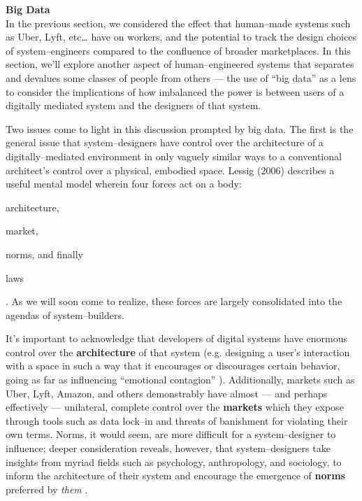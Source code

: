 \documentclass[11pt,titlepage]{article}
\newcommand{\sectitle}[1]{\textbf{#1}\\}
\begin{document}
\sectitle{Big Data}
In the previous section, we considered the effect that human--made systems such as
Uber, Lyft, etc\dots
have on workers, and the potential to track the design choices of system--engineers compared to the
confluence of broader marketplaces.
In this section,
we'll explore another aspect of human--engineered systems that separates and devalues
some classes of people from others --- the use of ``big data'' as a lens to consider the implications of
how imbalanced the power is between users of a digitally mediated system and the designers of that system.

Two issues come to light in this discussion prompted by big data.
The first is the general issue that system--designers have control over
the architecture of a digitally--mediated environment in only vaguely similar ways to
a conventional architect's control over a physical, embodied space.
Lessig (2006) describes a useful mental model %
wherein four forces act on a body:
\begin{inlinelist}
  \item architecture,
  \item market,
  \item norms, and finally
  \item laws
\end{inlinelist}
\cite{lessig2006code}.
As we will soon come to realize,
these forces are largely consolidated into the agendas of system--builders.

It's important to acknowledge that
developers of digital systems have enormous control over the \textbf{architecture} of that system
(e.g. designing a user's interaction with a space
in such a way that it encourages or discourages certain behavior,
going as far as influencing ``emotional contagion'' \cite{kramer2014experimental}).
Additionally, markets such as Uber, Lyft, Amazon, and others
demonstrably have almost --- and perhaps effectively ---
unilateral, complete control over the \textbf{markets} which they expose through tools such as
data lock--in and threats of banishment for violating their own terms.
Norms, it would seem, are more difficult for a system--designer to influence;
deeper consideration reveals, however, that system--designers take insights from myriad fields such as
psychology, anthropology, and sociology, to inform the architecture of their system and 
encourage the emergence of \textbf{norms} preferred by \textit{them}
\cite{anderson2013steering,successfulOnlineCommunities}.
\end{document}
